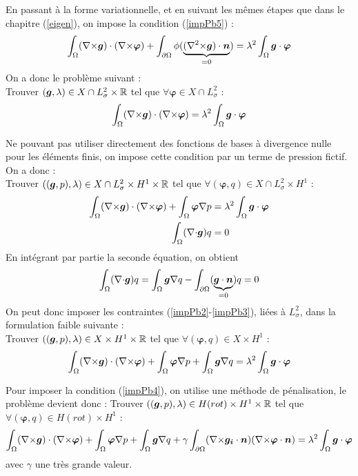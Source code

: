 En passant à la forme variationnelle, et en suivant les mêmes étapes que dans le chapitre (\ref{eigen}), on impose la condition (\ref{impPb5}) :
\[
\int_\Omega ({\nabla\times}\bm{g})\cdot({\nabla\times}\bm{\varphi}) + \int_{\partial\Omega} \phi(\underbrace{({\nabla^2\times} \bm{g})\cdot\bm{n}}_{=0})= \lambda^2\int_\Omega \bm{g}\cdot\bm{\varphi}
\]
On a donc le problème suivant :\\
Trouver $(\bm{g},\lambda)\in X\cap L^2_\sigma\times{\mathbb{R}}$ tel que $\forall \bm{\varphi}\in X\cap L^2_\sigma$ :
\[
\int_\Omega ({\nabla\times}\bm{g})\cdot({\nabla\times}\bm{\varphi}) = \lambda^2\int_\Omega \bm{g}\cdot\bm{\varphi}
\]

Ne pouvant pas utiliser directement des fonctions de bases à divergence nulle pour les éléments finis, on impose cette condition par un terme de pression fictif. On a donc :\\
Trouver $((\bm{g},p),\lambda)\in X\cap L^2_\sigma \times H^1 \times {\mathbb{R}}$ tel que $\forall (\bm{\varphi},q)\in X\cap L^2_\sigma \times H^1$ :
\begin{align*}
\int_\Omega ({\nabla\times}\bm{g})\cdot({\nabla\times}\bm{\varphi}) + \int_\Omega\bm{\varphi}{\nabla} p &= \lambda^2\int_\Omega \bm{g}\cdot\bm{\varphi}\\
\int_\Omega ({\nabla\cdot}\bm{g}) q &= 0
\end{align*}
En intégrant par partie la seconde équation, on obtient
\[
\int_\Omega ({\nabla\cdot}\bm{g}) q = \int_\Omega \bm{g}{\nabla} q - \int_{\partial\Omega} (\underbrace{\bm{g}\cdot \bm{n}}_{=0})q = 0
\]
On peut donc imposer les contraintes (\ref{impPb2}-\ref{impPb3}), liées à $L^2_\sigma$, dans la formulation faible suivante :\\
Trouver $((\bm{g},p),\lambda)\in X \times H^1 \times {\mathbb{R}}$ tel que $\forall (\bm{\varphi},q)\in X \times H^1$ :
\[
\int_\Omega ({\nabla\times}\bm{g})\cdot({\nabla\times}\bm{\varphi}) + \int_\Omega\bm{\varphi}{\nabla} p + \int_\Omega \bm{g}{\nabla} q = \lambda^2\int_\Omega \bm{g}\cdot\bm{\varphi}
\]

Pour imposer la condition (\ref{impPb4}), on utilise une méthode de pénalisation, le problème devient donc :
Trouver $((\bm{g},p),\lambda)\in H(rot) \times H^1 \times {\mathbb{R}}$ tel que $\forall (\bm{\varphi},q)\in H(rot) \times H^1$ :
\begin{equation}
\label{impFvEigen}
\int_\Omega ({\nabla\times}\bm{g})\cdot({\nabla\times}\bm{\varphi}) + \int_\Omega\bm{\varphi}{\nabla} p + \int_\Omega \bm{g}{\nabla} q + \gamma\int_{\partial\Omega}({\nabla\times}\bm{g_i}\cdot\bm{n})({\nabla\times}\bm{\varphi}\cdot\bm{n}) = \lambda^2\int_\Omega \bm{g}\cdot\bm{\varphi}
\end{equation}
avec $\gamma$ une très grande valeur.


